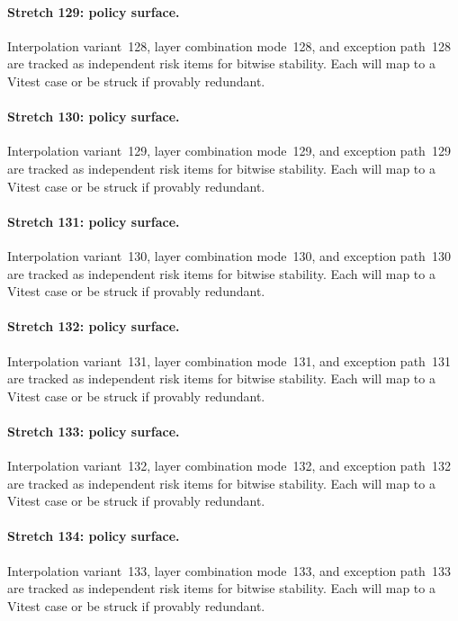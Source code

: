 \documentclass[sigconf,nonacm]{acmart}
\begin{document}
\paragraph{Stretch 129: policy surface.}
Interpolation variant~128, layer combination mode~128, and exception path~128 are tracked as independent risk items for bitwise stability. Each will map to a Vitest case or be struck if provably redundant. %

\paragraph{Stretch 130: policy surface.}
Interpolation variant~129, layer combination mode~129, and exception path~129 are tracked as independent risk items for bitwise stability. Each will map to a Vitest case or be struck if provably redundant. %

\paragraph{Stretch 131: policy surface.}
Interpolation variant~130, layer combination mode~130, and exception path~130 are tracked as independent risk items for bitwise stability. Each will map to a Vitest case or be struck if provably redundant. %

\paragraph{Stretch 132: policy surface.}
Interpolation variant~131, layer combination mode~131, and exception path~131 are tracked as independent risk items for bitwise stability. Each will map to a Vitest case or be struck if provably redundant. %

\paragraph{Stretch 133: policy surface.}
Interpolation variant~132, layer combination mode~132, and exception path~132 are tracked as independent risk items for bitwise stability. Each will map to a Vitest case or be struck if provably redundant. %

\paragraph{Stretch 134: policy surface.}
Interpolation variant~133, layer combination mode~133, and exception path~133 are tracked as independent risk items for bitwise stability. Each will map to a Vitest case or be struck if provably redundant. %
\end{document}
